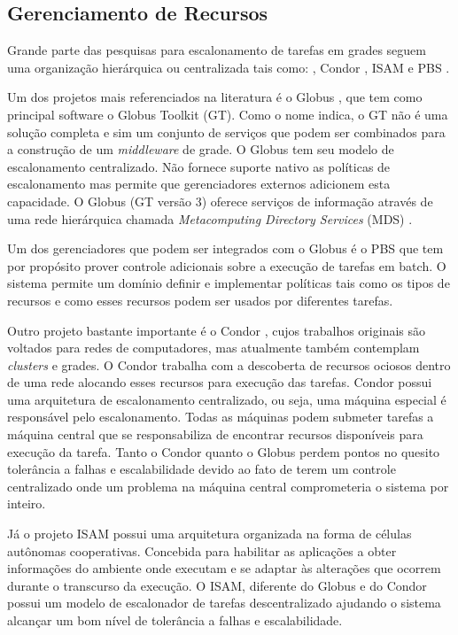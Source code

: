 \subsection{Gerenciamento de Recursos}
Grande parte das pesquisas para escalonamento de tarefas em grades seguem uma organização hierárquica ou centralizada tais como: \cite[Globus]{Foster1998}, Condor \cite{condor2007}, ISAM \cite{isam} e PBS \cite{Bayucan1998}.

Um dos projetos mais referenciados na literatura é o Globus \cite{Globus}, que tem como principal software o Globus Toolkit (GT). Como o nome indica, o GT não é uma solução completa e sim um conjunto de serviços que podem ser combinados para a construção de um \emph{middleware} de grade.
O Globus \cite{Foster1998} tem seu modelo de escalonamento centralizado. Não fornece suporte nativo as políticas de escalonamento mas permite que gerenciadores externos adicionem esta capacidade. O Globus (GT versão 3) oferece serviços de informação através de uma rede hierárquica chamada \emph{Metacomputing Directory Services} (MDS) \cite{Santos}.

Um dos gerenciadores que podem ser integrados com o Globus é o PBS \cite{Bayucan1998} que tem por propósito prover controle adicionais sobre a execução de tarefas em batch. O sistema permite um domínio definir e implementar políticas tais como os tipos de recursos e como esses recursos podem ser usados por diferentes tarefas.

Outro projeto bastante importante é o Condor \cite{condor2007}, cujos trabalhos originais são voltados para redes de computadores, mas atualmente também contemplam {\it clusters} e grades. O Condor trabalha com a descoberta de recursos ociosos dentro de uma rede alocando esses recursos para execução das tarefas. Condor possui uma arquitetura de escalonamento centralizado, ou seja, uma máquina especial é responsável pelo escalonamento. Todas as máquinas podem submeter tarefas a máquina central que se responsabiliza de encontrar recursos disponíveis para execução da tarefa. Tanto o Condor quanto o Globus perdem pontos no quesito tolerância a falhas e escalabilidade devido ao fato de terem um controle centralizado onde um problema na máquina central comprometeria o sistema por inteiro.

Já o projeto ISAM \cite{isam} possui uma arquitetura organizada na forma de células autônomas cooperativas. Concebida para habilitar as aplicações a obter informações do ambiente onde executam e se adaptar às alterações que ocorrem durante o transcurso da execução. O ISAM, diferente do Globus e do Condor possui um modelo de escalonador de tarefas descentralizado ajudando o sistema alcançar um bom nível de tolerância a falhas e escalabilidade.
